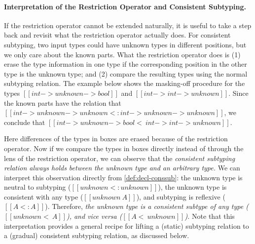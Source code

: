 \paragraph{Interpretation of the Restriction Operator and Consistent Subtyping.}
If the restriction operator cannot be extended naturally, it is useful to
take a step back and revisit what the restriction operator actually does. For
consistent subtyping, two input types could have unknown types in different
positions, but we only care about the known parts. What the restriction
operator does is (1) erase the type information in one type if the corresponding
position in the other type is the unknown type; and (2) compare the resulting types
using the normal subtyping relation. The example below shows the
masking-off procedure for the types $[[ int -> unknown -> bool  ]]$ and $[[int -> int -> unknown]]$.
Since the known parts have the relation that $[[ int -> unknown -> unknown <: int -> unknown -> unknown ]]$, we conclude that
$[[ int -> unknown -> bool <~ int -> int -> unknown  ]]$.
\begin{center}
\end{center}
Here differences of the types in boxes are erased because of the restriction
operator. Now if we compare the types in boxes directly instead of through the
lens of the restriction operator, we can observe that the \emph{consistent
  subtyping relation always holds between the unknown type and an arbitrary
  type.} We can interpret this observation directly from
\cref{def:decl-conssub}: the unknown type is neutral to subtyping ($[[ unknown <: unknown  ]]$),
the unknown type is consistent with any type ($[[unknown ~ A]]$),
and subtyping is reflexive ($[[A <: A]]$). Therefore,
\emph{the unknown type is a consistent subtype of any type ($[[  unknown <~ A  ]]$), and vice versa ($[[ A <~ unknown ]]$).}
Note that this interpretation provides a
general recipe for lifting a (static) subtyping relation to a (gradual)
consistent subtyping relation, as discussed below.

